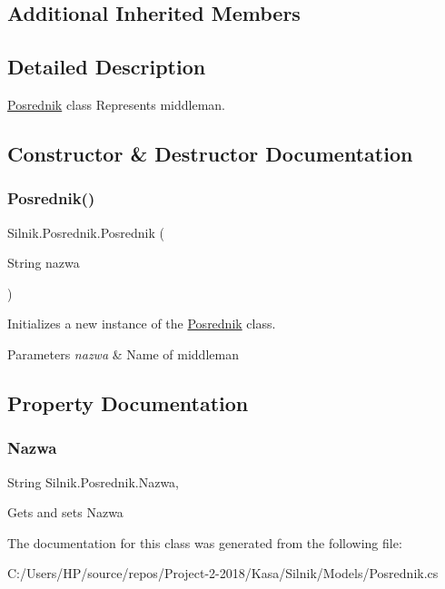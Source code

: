 \subsection*{Additional Inherited Members}


\subsection{Detailed Description}
\mbox{\hyperlink{class_silnik_1_1_posrednik}{Posrednik}} class Represents middleman. 



\subsection{Constructor \& Destructor Documentation}
\mbox{\label{class_silnik_1_1_posrednik_a55c7161a027803a4ca45a48466c13142}} 
\subsubsection{\texorpdfstring{Posrednik()}{Posrednik()}}
{\footnotesize\ttfamily Silnik.\+Posrednik.\+Posrednik (\begin{DoxyParamCaption}\item[{String}]{nazwa }\end{DoxyParamCaption})}



Initializes a new instance of the \mbox{\hyperlink{class_silnik_1_1_posrednik}{Posrednik}} class. 


\begin{DoxyParams}{Parameters}
{\em nazwa} & Name of middleman\\
\hline
\end{DoxyParams}


\subsection{Property Documentation}
\mbox{\label{class_silnik_1_1_posrednik_a2f7b267d89c092873db10e7928da53d7}} 
\subsubsection{\texorpdfstring{Nazwa}{Nazwa}}
{\footnotesize\ttfamily String Silnik.\+Posrednik.\+Nazwa\hspace{0.3cm}{\ttfamily [get]}, {\ttfamily [set]}}



Gets and sets Nazwa 



The documentation for this class was generated from the following file\+:\begin{DoxyCompactItemize}
\item 
C\+:/\+Users/\+H\+P/source/repos/\+Project-\/2-\/2018/\+Kasa/\+Silnik/\+Models/Posrednik.\+cs\end{DoxyCompactItemize}
